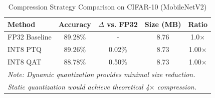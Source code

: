 \begin{table}[h]
\centering
\caption{Compression Strategy Comparison on CIFAR-10 (MobileNetV2)}
\label{tab:compression_comparison}
\begin{tabular}{lcccc}
\hline
\textbf{Method} & \textbf{Accuracy} & \textbf{$\Delta$ vs. FP32} & \textbf{Size (MB)} & \textbf{Ratio} \\
\hline
FP32 Baseline & 89.28\% & - & 8.76 & 1.0$\times$ \\
INT8 PTQ & 89.26\% & 0.02\% & 8.73 & 1.00$\times$ \\
INT8 QAT & 88.78\% & 0.50\% & 8.73 & 1.00$\times$ \\
\hline
\multicolumn{5}{l}{\textit{Note: Dynamic quantization provides minimal size reduction.}} \\
\multicolumn{5}{l}{\textit{Static quantization would achieve theoretical 4$\times$ compression.}} \\
\end{tabular}
\end{table}
